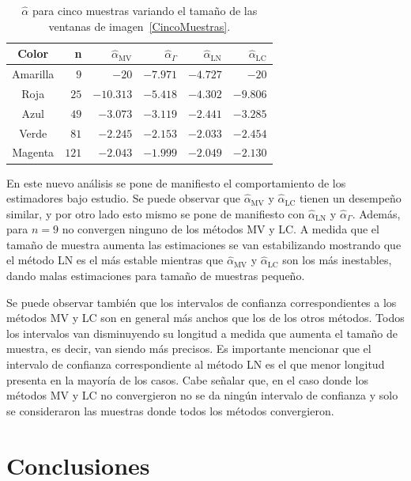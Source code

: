 \begin{table}[H]
	\centering
	\caption{\label{TablaCincoMuestras}$\widehat{\alpha}$ para cinco muestras variando el tamaño de las ventanas de imagen~\ref{CincoMuestras}.}
	\begin{tabular}{c*5{r}}
		\toprule
		Color       &  n    &  $\widehat{\alpha}_{\text{MV}}$    &  $\widehat{\alpha}_{\Gamma}$  &  $\widehat{\alpha}_{\text{LN}}$ &  $\widehat{\alpha}_{\text{LC}}$\\
		\midrule
		Amarilla    & $9$     & $-20$      & $-7.971$ & $-4.727$ & $-20$\\
		Roja        & $25$    & $-10.313$  & $-5.418$ & $-4.302$ & $-9.806$\\
		Azul        & $49$    & $-3.073$   & $-3.119$ & $-2.441$ & $-3.285$\\
		Verde       & $81$    & $-2.245$   & $-2.153$ & $-2.033$ & $-2.454$\\
		Magenta     & $121$   & $-2.043$   & $-1.999$ & $-2.049$ & $-2.130$\\
		\bottomrule
	\end{tabular}
\end{table}

En este nuevo análisis se pone de manifiesto el comportamiento de los estimadores bajo estudio. Se puede observar que $\widehat{\alpha}_{\text{MV}}$ y $\widehat{\alpha}_{\text{LC}}$ tienen un desempeño similar, y por otro lado esto mismo se pone de manifiesto con $\widehat{\alpha}_{\text{LN}}$ y $\widehat{\alpha}_{\Gamma}$. Además, para $n=9$ no convergen ninguno de los métodos MV y LC. A medida que el tamaño de muestra aumenta las estimaciones se van estabilizando mostrando que el método LN es el más estable mientras que $\widehat{\alpha}_{\text{MV}}$ y $\widehat{\alpha}_{\text{LC}}$ son los más inestables, dando malas estimaciones para tamaño de muestras pequeño. 

Se puede observar también que los intervalos de confianza correspondientes a los métodos MV y LC son en general más anchos que los de los otros métodos. Todos los intervalos van disminuyendo su longitud a medida que aumenta el tamaño de muestra, es decir, van siendo más precisos. Es importante mencionar que el intervalo de confianza correspondiente al método LN es el que menor longitud presenta en la mayoría de los casos. Cabe señalar que, en el caso donde los métodos MV y LC no convergieron no se da ningún intervalo de confianza y solo se consideraron las muestras donde todos los métodos convergieron.

\section{Conclusiones}

